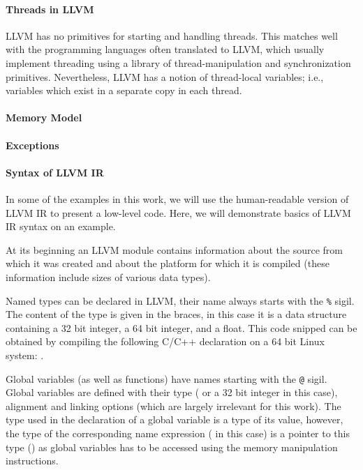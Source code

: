 \paragraph{Threads in LLVM}

LLVM has no primitives for starting and handling threads.
This matches well with the programming languages often translated to LLVM, which usually implement threading using a library of thread-manipulation and synchronization primitives.
Nevertheless, LLVM has a notion of thread-local variables; i.e., variables which exist in a separate copy in each thread.

\paragraph{Memory Model}



\paragraph{Exceptions}

\paragraph{Syntax of LLVM IR}

In some of the examples in this work, we will use the human-readable version of LLVM IR to present a low-level code.
Here, we will demonstrate basics of LLVM IR syntax on an example.


\noindent
At its beginning an LLVM module contains information about the source from which it was created and about the platform for which it is compiled (these information include sizes of various data types).


\noindent
Named types can be declared in LLVM, their name always starts with the \texttt{\%} sigil.
The content of the type is given in the braces, in this case it is a data structure containing a 32 bit integer, a 64 bit integer, and a float.
This code snipped can be obtained by compiling the following C/C++ declaration on a 64 bit Linux system: .


\noindent
Global variables (as well as functions) have names starting with the \texttt{@} sigil.
Global variables are defined with their type ( or a 32 bit integer in this case), alignment and linking options (which are largely irrelevant for this work).
The type used in the declaration of a global variable is a type of its value, however, the type of the corresponding name expression ( in this case) is a pointer to this type () as global variables has to be accessed using the memory manipulation instructions.


